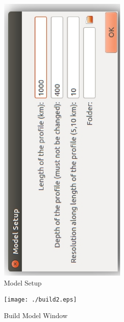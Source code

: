 \documentclass[12pt]{article}
\begin{document}
\begin{figure}
\centering \includegraphics[width=15pc,angle=-90]{./build1.eps}
\caption{Model Setup}
\label{build1}
\end{figure}
\begin{figure}
\centering \texttt{[image: ./build2.eps]}
\caption{Build Model Window}
\label{build2}
\end{figure}
\end{document}
